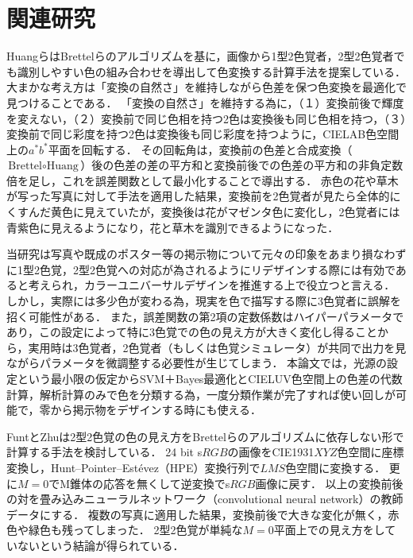 \documentclass[uplatex,paper=a4,fontsize=4.0truemm,jafontsize=4.0truemm,head_space=30.0truemm,foot_space=30.0truemm,baselineskip=8.0truemm,line_length=40zw,gutter=25.0truemm,oneside,openany,fleqn,hanging_panctuation,open_bracket_pos=nibu_tentsuki,dvipdfmx,jis2004,book,titlepage]{jlreq}
\theoremstyle{mystyle}
\newcommand{\mathdisplaystyle}[1]{\(\displaystyle{#1}\)}
\begin{document}
	\chapter{関連研究}
		HuangらはBrettelらのアルゴリズムを基に，画像から1型2色覚者，2型2色覚者でも識別しやすい色の組み合わせを導出して色変換する計算手法を提案している\cite{Huang2007}．
		大まかな考え方は「変換の自然さ」を維持しながら色差を保つ色変換を最適化で見つけることである．
		「変換の自然さ」を維持する為に，（１）変換前後で輝度を変えない，（２）変換前で同じ色相を持つ2色は変換後も同じ色相を持つ，（３）変換前で同じ彩度を持つ2色は変換後も同じ彩度を持つように，CIELAB色空間上の\mathdisplaystyle{a^\ast b^\ast}平面を回転する．
		その回転角は，変換前の色差と合成変換（\mathdisplaystyle{\textrm{Brettel}\circ\textrm{Huang}}）後の色差の差の平方和と変換前後での色差の平方和の非負定数倍を足し，これを誤差関数として最小化することで導出する．
		赤色の花や草木が写った写真に対して手法を適用した結果，変換前を2色覚者が見たら全体的にくすんだ黄色に見えていたが，変換後は花がマゼンタ色に変化し，2色覚者には青紫色に見えるようになり，花と草木を識別できるようになった．

		当研究は写真や既成のポスター等の掲示物について元々の印象をあまり損なわずに1型2色覚，2型2色覚への対応が為されるようにリデザインする際には有効であると考えられ，カラーユニバーサルデザインを推進する上で役立つと言える．
		しかし，実際には多少色が変わる為，現実を色で描写する際に3色覚者に誤解を招く可能性がある．
		また，誤差関数の第2項の定数係数はハイパーパラメータであり，この設定によって特に3色覚での色の見え方が大きく変化し得ることから，実用時は3色覚者，2色覚者（もしくは色覚シミュレータ）が共同で出力を見ながらパラメータを微調整する必要性が生じてしまう．
		本論文では，光源の設定という最小限の仮定からSVM＋Bayes最適化とCIELUV色空間上の色差の代数計算，解析計算のみで色を分類する為，一度分類作業が完了すれば使い回しが可能で，零から掲示物をデザインする時にも使える．

		FuntとZhuは2型2色覚の色の見え方をBrettelらのアルゴリズムに依存しない形で計算する手法を検討している\cite{Funt2018}．
		24 bit s\mathdisplaystyle{RGB}の画像をCIE1931\mathdisplaystyle{XYZ}色空間に座標変換し，Hunt--Pointer--Estévez（HPE）変換行列で\mathdisplaystyle{LMS}色空間に変換する．
		更に\mathdisplaystyle{M=0}でM錐体の応答を無くして逆変換でs\mathdisplaystyle{RGB}画像に戻す．
		以上の変換前後の対を畳み込みニューラルネットワーク（convolutional neural network）の教師データにする．
		複数の写真に適用した結果，変換前後で大きな変化が無く，赤色や緑色も残ってしまった．
		2型2色覚が単純な\mathdisplaystyle{M=0}平面上での見え方をしていないという結論が得られている．
\end{document}
